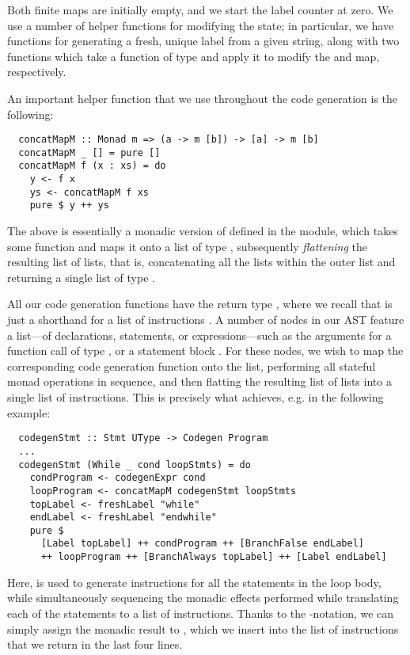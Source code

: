 Both finite maps are initially empty, and we start the label counter at zero.
We use a number of helper functions for modifying the state; in particular, we
have functions for generating a fresh, unique label from a given string, along
with two functions which take a function of type
 and apply it to modify the
 and  map, respectively.

An important helper function that we use throughout the code generation is the
following:
\begin{verbatim}
  concatMapM :: Monad m => (a -> m [b]) -> [a] -> m [b]
  concatMapM _ [] = pure []
  concatMapM f (x : xs) = do
    y <- f x
    ys <- concatMapM f xs
    pure $ y ++ ys
\end{verbatim}
%
The above is essentially a monadic version of
 defined in the 
module, which takes some function  and maps it onto a
list of type \haskell{[a]}, subsequently \emph{flattening} the resulting
list of lists, that is, concatenating all the lists within the outer list and
returning a single list of type \haskell{[b]}.

All our code generation functions have the return type ,
where we recall that  is just a shorthand for a list of
instructions \haskell{[Instr]}.
A number of nodes in our AST feature a list---of declarations, statements,
or expressions---such as the arguments for a function call of type
, or a statement block .
For these nodes, we wish to map the corresponding code generation function onto
the list, performing all stateful monad operations in sequence, and then
flatting the resulting list of lists into a single list of instructions.
This is precisely what  achieves, e.g. in the following
example:
%
\begin{verbatim}
  codegenStmt :: Stmt UType -> Codegen Program
  ...
  codegenStmt (While _ cond loopStmts) = do
    condProgram <- codegenExpr cond
    loopProgram <- concatMapM codegenStmt loopStmts
    topLabel <- freshLabel "while"
    endLabel <- freshLabel "endwhile"
    pure $
      [Label topLabel] ++ condProgram ++ [BranchFalse endLabel]
      ++ loopProgram ++ [BranchAlways topLabel] ++ [Label endLabel]
\end{verbatim}

Here,  is used to generate instructions for
all the statements in the loop body, while simultaneously sequencing the monadic
effects performed while translating each of the statements to a list of
instructions. Thanks to the -notation, we can simply assign the
monadic result to , which we insert into the list of
instructions that we return in the last four lines.

